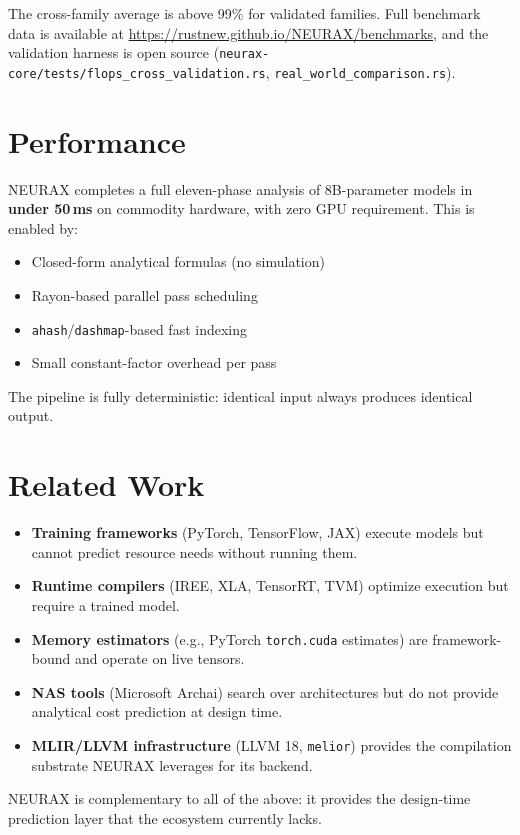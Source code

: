 \documentclass[11pt]{article}
\begin{document}
The cross-family average is above 99\% for validated families. Full benchmark data is available at \url{https://rustnew.github.io/NEURAX/benchmarks}, and the validation harness is open source (\texttt{neurax-core/tests/flops\_cross\_validation.rs}, \texttt{real\_world\_comparison.rs}).

\section{Performance}

NEURAX completes a full eleven-phase analysis of 8B-parameter models in \textbf{under 50\,ms} on commodity hardware, with zero GPU requirement. This is enabled by:
\begin{itemize}
  \item Closed-form analytical formulas (no simulation)
  \item Rayon-based parallel pass scheduling
  \item \texttt{ahash}/\texttt{dashmap}-based fast indexing
  \item Small constant-factor overhead per pass
\end{itemize}
The pipeline is fully deterministic: identical input always produces identical output.

\section{Related Work}
\begin{itemize}
  \item \textbf{Training frameworks} (PyTorch, TensorFlow, JAX) execute models but cannot predict resource needs without running them.
  \item \textbf{Runtime compilers} (IREE, XLA, TensorRT, TVM) optimize execution but require a trained model.
  \item \textbf{Memory estimators} (e.g., PyTorch \texttt{torch.cuda} estimates) are framework-bound and operate on live tensors.
  \item \textbf{NAS tools} (Microsoft Archai) search over architectures but do not provide analytical cost prediction at design time.
  \item \textbf{MLIR/LLVM infrastructure} (LLVM 18, \texttt{melior}) provides the compilation substrate NEURAX leverages for its backend.
\end{itemize}
NEURAX is complementary to all of the above: it provides the design-time prediction layer that the ecosystem currently lacks.
\end{document}
